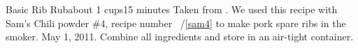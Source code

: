 \begin{recipe}{Basic Rib Rub}{about 1 cups}{15 minutes}
\freeform Taken from \emph{}. We used this recipe
with Sam's Chili powder \#4, recipe number \string~/\ref{sam4} to make
pork spare ribs in the smoker.  May 1, 2011.
Combine all ingredients and store in an air-tight container.
\end{recipe}
